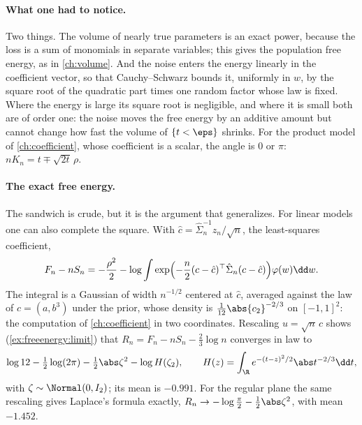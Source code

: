 \begin{refsection}
\paragraph{What one had to notice.} Two things. The volume of nearly true parameters is an exact power, because the loss is a sum of monomials in separate variables; this gives the population free energy, as in \cref{ch:volume}. And the noise enters the energy linearly in the coefficient vector, so that Cauchy--Schwarz bounds it, uniformly in $w$, by the square root of the quadratic part times one random factor whose law is fixed. Where the energy is large its square root is negligible, and where it is small both are of order one: the noise moves the free energy by an additive amount but cannot change how fast the volume of $\{t<\eps\}$ shrinks. For the product model of \cref{ch:coefficient}, whose coefficient is a scalar, the angle is $0$ or $\pi$: $nK_n=t\mp\sqrt{2t}\,\rho$.

\paragraph{The exact free energy.} The sandwich is crude, but it is the argument that generalizes. For linear models one can also complete the square. With $\hat c=\hat\Sigma_n^{-1}z_n/\sqrt n$, the least-squares coefficient,
\begin{equation}\label{eq:freeenergy:complete}
F_n-nS_n=-\frac{\rho^2}2-\log\int\exp\Bigl(-\frac n2(c-\hat c)^\top\hat\Sigma_n(c-\hat c)\Bigr)\varphi(w)\dd w .
\end{equation}
The integral is a Gaussian of width $n^{-1/2}$ centered at $\hat c$, averaged against the law of $c=(a,b^3)$ under the prior, whose density is $\frac1{12}\abs{c_2}^{-2/3}$ on $[-1,1]^2$: the computation of \cref{ch:coefficient} in two coordinates. Rescaling $u=\sqrt n\,c$ shows (\cref{ex:freeenergy:limit}) that $R_n=F_n-nS_n-\tfrac23\log n$ converges in law to
\begin{equation}\label{eq:freeenergy:sexticlimit}
\log12-\tfrac12\log(2\pi)-\tfrac12\abs\zeta^2-\log H(\zeta_2),\qquad H(z)=\int_\R e^{-(t-z)^2/2}\abs t^{-2/3}\dd t,
\end{equation}
with $\zeta\sim\Normal(0,I_2)$; its mean is $-0.991$. For the regular plane the same rescaling gives Laplace's formula exactly, $R_n\to-\log\frac\pi2-\tfrac12\abs\zeta^2$, with mean $-1.452$.


\end{refsection}
